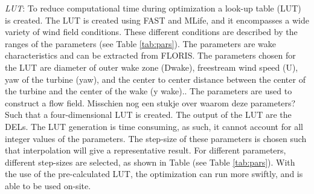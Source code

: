 \documentclass[twoside,twocolumn]{article}
\begin{document}
\textit{LUT}: To reduce computational time during optimization a look-up table (LUT) is created. The LUT is created using FAST and MLife, and it encompasses a wide variety of wind field conditions. 
These different conditions are described by the ranges of the parameters (see Table \ref{tab:pars}). The parameters are wake characteristics and can be extracted from FLORIS. The parameters chosen for the LUT are diameter of outer wake zone (Dwake), freestream wind speed (U), yaw of the turbine (yaw), and the center to center distance between the center of the turbine and the center of the wake (y wake).. The parameters are used to construct a flow field. Misschien nog een stukje over waarom deze parameters? Such that a four-dimensional LUT is created. The output of the LUT are the DELs. The LUT generation is time consuming, as such, it cannot account for all integer values of the parameters. The step-size of these parameters is chosen such that interpolation will give a representative result. For different parameters, different step-sizes are selected, as shown in Table (see Table \ref{tab:pars}). With the use of the pre-calculated LUT, the optimization can run more swiftly, and is able to be used on-site.
\end{document}
